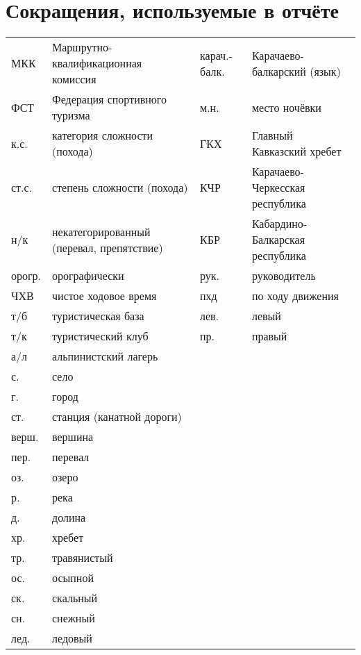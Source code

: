 \section*{Сокращения, используемые в отчёте}
\begin{table}[h!]
\centering
\begin{tabular}{p{} p{} | p{} p{}}
	МКК                                  &   Маршрутно-квалификационная комиссия  &	карач.-балк.	&	Карачаево-балкарский (язык)	\\
	ФСТ                                &   Федерация спортивного туризма  & м.н. & место ночёвки \\
	к.с.                               &   категория сложности (похода) & ГКХ	&	Главный Кавказский хребет \\
	ст.с.							& степень сложности (похода) 	& КЧР & Карачаево-Черкесская республика \\
	н/к                            &   некатегорированный (перевал, препятствие) & КБР & Кабардино-Балкарская республика \\
	орогр.                &   орографически & рук. &   руководитель \\
	ЧХВ                          &   чистое ходовое время  &пхд	&	по ходу движения \\
	т/б                         &   туристическая база & лев. &   левый \\
	т/к                         &   туристический клуб & пр. &   правый \\
	а/л                  &   альпинистский лагерь & & \\
		с. & село & & \\
	г. & город & & \\
	ст. & станция (канатной дороги) & & \\
	верш.               &   вершина & & \\
	пер.               &   перевал & & \\
	оз.             &   озеро & & \\
	р.             &   река & & \\
	д.	&	долина & &\\
	хр. &   хребет& & \\
	тр. &   травянистый & &\\
	ос. &   осыпной& & \\
	ск. &   скальный & &\\
	сн. &   снежный & &\\
	лед. &   ледовый & &\\	
\end{tabular}
\end{table}
\clearpage